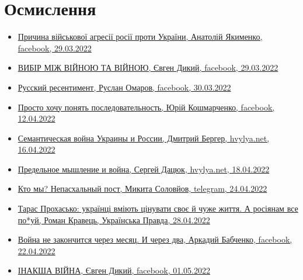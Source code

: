  
 
 
 
 
\section{Осмислення}
\label{sec:topics.vojna.osmyslenie}


\begin{itemize} %

\item \hyperlink{29_03_2022.fb.jakimenko_anatolij.1.prichina_agressii}{%
Причина військової агресії росії проти України, Анатолій Якименко, facebook, 29.03.2022%
}

\item \hyperlink{29_03_2022.fb.dykyj_evgen.1.vijna_vijna}{%
ВИБІР МІЖ ВІЙНОЮ ТА ВІЙНОЮ, Євген Дикий, facebook, 29.03.2022%
}

\item \hyperlink{30_03_2022.fb.omarov_ruslan.1.russkij_ressentiment}{%
Русский ресентимент, Руслан Омаров, facebook, 30.03.2022%
}

\item \hyperlink{12_04_2022.fb.koshmarchenko_jurij.1.posledovatelnost}{%
Просто хочу понять последовательность, Юрій Кошмарченко, facebook, 12.04.2022%
}

\item \hyperlink{16_04_2022.stz.news.ua.hvylya.1.semantic_war_ukrros}{%
Семантическая война Украины и России, Дмитрий Бергер, hvylya.net, 16.04.2022
}

\item \hyperlink{18_04_2022.stz.news.ua.hvylya.1.predelnoje_myshlenie_i_vojna}{%
Предельное мышление и война, Сергей Дацюк, hvylya.net, 18.04.2022%
}

\item \hyperlink{24_04_2022.tg.solovjov_mikita.harkov.demsokyra.1.kto_my_nepashalnyj_post}{%
Кто мы? Непасхальный пост, Микита Соловйов, telegram, 24.04.2022%
}

\item \hyperlink{28_04_2022.stz.news.ua.pravda.1.prohasjko_rossiane_pohuj}{%
Тарас Прохасько: українці вміють цінувати своє й чуже життя. А росіянам все по*уй, %
Роман Кравець, Українська Правда, 28.04.2022%
}


\item \hyperlink{22_04_2022.fb.babchenko_arkadii.1.vojna_ne_zakonchitsja}{%
Война не закончится через месяц. И через два, Аркадий Бабченко, facebook, 22.04.2022%
}


\item \hyperlink{01_05_2022.fb.dykyj_evgen.1.inaksha_vijna}{%
ІНАКША ВІЙНА, Євген Дикий, facebook, 01.05.2022%
}

\end{itemize} %
